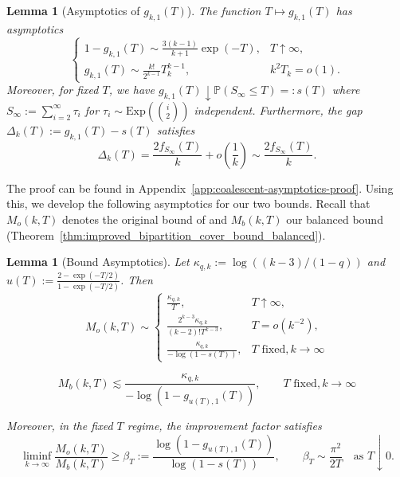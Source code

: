 \documentclass[10pt,oneside,reqno]{article}
\theoremstyle{plain}
\newtheorem{lemma}[theorem]{Lemma}
\theoremstyle{definition}
\numberwithin{equation}{section}
\renewcommand{\leq}{\leqslant}
\renewcommand{\geq}{\geqslant}
\renewcommand{\P}{\mathbb{P}}
\begin{document}
\begin{lemma}[Asymptotics of $g_{k,1}(T)$]
The function $T \mapsto g_{k,1}(T)$ has asymptotics
\begin{equation}
     \begin{cases} 1 - g_{k,1}(T) \sim \frac{3(k-1)}{k+1} \exp(-T), & T \uparrow \infty, \\ 
 g_{k,1}(T) \sim \frac{k!}{2^{k-1}} T_k^{k-1}, &  k^2T_k = o(1).
\end{cases}
\label{eqn:asymptotics_T_mapsto_g_k1(T)}
\end{equation}
\noindent Moreover, for fixed $T$, we have $g_{k,1}(T) \downarrow \P(S_\infty \leq T) =: s(T)$ where $S_\infty := \sum_{i=2}^\infty \tau_i$ for $\tau_i \sim \mathrm{Exp}\left({i \choose 2}\right)$ independent. Furthermore, the gap $\Delta_k(T) := g_{k,1}(T) - s(T)$ satisfies
%
\[\Delta_k(T) = \frac{2f_{S_\infty}(T)}{k} + o\left(\frac{1}{k}\right) \sim \frac{2f_{S_\infty}(T)}{k}.\]
%
\label{lem:asymptotics_g_k1(T)}
\end{lemma} 

\noindent The proof can be found in Appendix~\ref{app:coalescent-asymptotics-proof}. 
Using this, we develop the following asymptotics for our two bounds. Recall that $M_o(k,T)$ denotes the original bound of \citet{uricchio2016_bipartition_cover} and $M_b(k,T)$ our balanced bound (Theorem~\ref{thm:improved_bipartition_cover_bound_balanced}). 

\begin{lemma}[Bound Asymptotics]
    Let $\kappa_{q,k} := \log((k-3)/(1-q))$ and $u(T) := \frac{2-\exp(-T/2)}{1-\exp(-T/2)}$. Then
    \[M_o(k,T)  \sim \begin{cases}
    \frac{\kappa_{q,k}}{T}, & T \uparrow \infty, \\
    \frac{2^{k-3}\kappa_{q,k}}{(k-2)! T^{k-3}}, & T = o(k^{-2}), \\
    \frac{\kappa_{q,k}}{-\log(1-s(T))}, & T \text{ fixed}, k \to \infty
\end{cases}\]

    \[M_b(k,T) \lesssim 
        \frac{\kappa_{q,k}}{-\log(1-g_{u(T), 1}(T))}, \qquad T \text{ fixed}, k \to \infty\]

    \noindent Moreover, in the fixed $T$ regime, the improvement factor satisfies
    \[
    \liminf_{k\to\infty}\frac{M_o(k,T)}{M_b(k,T)}
    \geq \beta_T
    :=\frac{\log(1-g_{u(T),1}(T))}{\log(1-s(T))},
    \qquad
    \beta_T\sim \frac{\pi^2}{2T}
    \quad\text{as }T\downarrow0.
    \]
    \label{lem:bound_asymptotics}
\end{lemma}
\end{document}

